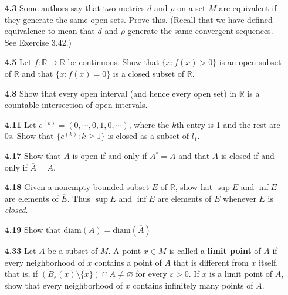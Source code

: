 \documentclass[12pt]{amsart}
\def\diam{\mathrm{diam}}
\def\iff{if and only if }
\def\RR{{\mathbb R}}
\renewcommand{\emptyset}{\varnothing}
\renewcommand{\epsilon}{\varepsilon}
\begin{document}
\begin{enumerate}

\item[\bf 4.3] Some authors say that two metrics $d$ and $\rho$ on a set $M$ are equivalent if they generate the same open sets. Prove this. (Recall that we have defined equivalence to mean that $d$ and $\rho$ generate the same convergent sequences. See Exercise 3.42.)

\bigskip

\item[\bf 4.5] Let $f:\RR\to\RR$ be continuous. Show that $\{x:f(x)>0\}$ is an open subset of $\RR$ and that $\{x:f(x)=0\}$ is a closed subset of $\RR$.

\bigskip

\item[\bf 4.8] Show that every open interval (and hence every open set) in $\RR$ is a countable intersection of open intervals. 

\bigskip

\item[\bf 4.11] Let $e^{(k)}=(0,\cdots,0,1,0,\cdots)$, where the $k$th entry is 1 and the rest are 0s. Show that $\{e^{(k)} : k\geq 1\}$ is closed as a subset of $l_1$.

\bigskip

\item[\bf 4.17] Show that $A$ is open \iff $A^\circ=A$ and that $A$ is closed \iff $\overline A = A$.

\bigskip

\item[\bf 4.18] Given a nonempty bounded subset $E$ of $\RR$, show hat $\sup E$ and $\inf E$ are elements of $\overline E$. Thus $\sup E$ and $\inf E$ are elements of $E$ whenever $E$ is \textit{closed}.

\bigskip

\item[\bf 4.19] Show that $\diam(A)=\diam\left(\overline A\right)$

\bigskip

\item[\bf 4.33] Let $A$ be a subset of $M$. A point $x\in M$ is called a {\bf limit point} of $A$ if every neighborhood of $x$ contains a point of $A$ that is different from $x$ itself, that is, if $(B_\epsilon(x)\setminus\{x\})\cap A\neq\emptyset$ for every $\epsilon>0$. If $x$ is a limit point of $A$, show that every neighborhood of $x$ contains infinitely many points of $A$.

\bigskip


\end{enumerate}
\end{document}
